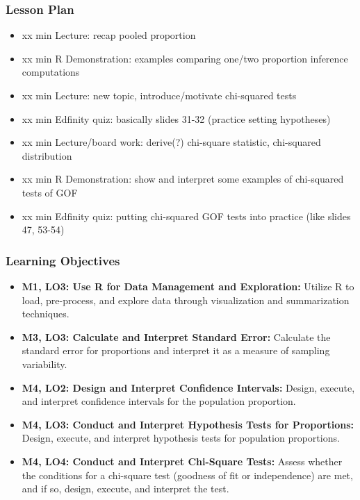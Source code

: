 \begin{frame}
    \frametitle{Lesson Plan}
    \begin{itemize}
        \item xx min Lecture: recap pooled proportion
        \item xx min R Demonstration: examples comparing one/two proportion inference computations
        \item xx min Lecture: new topic, introduce/motivate chi-squared tests
        \item xx min Edfinity quiz: basically slides 31-32 (practice setting hypotheses)
        \item xx min Lecture/board work: derive(?) chi-square statistic, chi-squared distribution
        \item xx min R Demonstration: show and interpret some examples of chi-squared tests of GOF
        \item xx min Edfinity quiz: putting chi-squared GOF tests into practice (like slides 47, 53-54)
    \end{itemize}
\end{frame}
            
\begin{frame}
    \frametitle{Learning Objectives}
    \begin{itemize}
        \item \textbf{M1, LO3: Use R for Data Management and Exploration:} Utilize R to load, pre-process, and explore data through visualization and summarization techniques.
        \item \textbf{M3, LO3: Calculate and Interpret Standard Error:} Calculate the standard error for proportions and interpret it as a measure of sampling variability.
        \item \textbf{M4, LO2: Design and Interpret Confidence Intervals:} Design, execute, and interpret confidence intervals for the population proportion.
        \item \textbf{M4, LO3: Conduct and Interpret Hypothesis Tests for Proportions:} Design, execute, and interpret hypothesis tests for population proportions.
        \item \textbf{M4, LO4: Conduct and Interpret Chi-Square Tests:} Assess whether the conditions for a chi-square test (goodness of fit or independence) are met, and if so, design, execute, and interpret the test.
    \end{itemize}
\end{frame}
    
